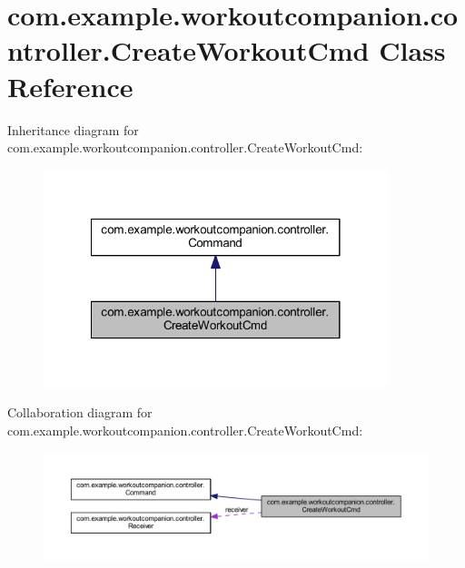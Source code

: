 \hypertarget{classcom_1_1example_1_1workoutcompanion_1_1controller_1_1_create_workout_cmd}{\section{com.\-example.\-workoutcompanion.\-controller.\-Create\-Workout\-Cmd Class Reference}
\label{classcom_1_1example_1_1workoutcompanion_1_1controller_1_1_create_workout_cmd}
}


Inheritance diagram for com.\-example.\-workoutcompanion.\-controller.\-Create\-Workout\-Cmd\-:
\nopagebreak
\begin{figure}[H]
\begin{center}
\leavevmode
\includegraphics[width=284pt]{classcom_1_1example_1_1workoutcompanion_1_1controller_1_1_create_workout_cmd__inherit__graph}
\end{center}
\end{figure}


Collaboration diagram for com.\-example.\-workoutcompanion.\-controller.\-Create\-Workout\-Cmd\-:
\nopagebreak
\begin{figure}[H]
\begin{center}
\leavevmode
\includegraphics[width=350pt]{classcom_1_1example_1_1workoutcompanion_1_1controller_1_1_create_workout_cmd__coll__graph}
\end{center}
\end{figure}
